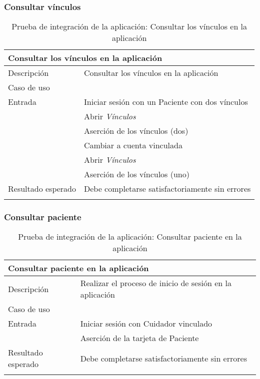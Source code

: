 \vspace{-15pt}
\subsubsection{Consultar vínculos}

\begin{longtable}{|p{} p{}|}
    \hline
    \multicolumn{2}{|l|}{\textbf{Consultar los vínculos en la aplicación}} \\ \hline 
    Descripción                 & Consultar los vínculos en la aplicación \\ \hline
    Caso de uso                 & \nameref{cu:consultar_cuidador} \\ \hline
    Entrada                     & Iniciar sesión con un Paciente con dos vínculos \\
                                & Abrir \emph{Vínculos} \\ 
                                & Aserción de los vínculos (dos) \\
                                & Cambiar a cuenta vinculada \\
                                & Abrir \emph{Vínculos} \\ 
                                & Aserción de los vínculos (uno) \\
                                \hline
    Resultado esperado          & Debe completarse satisfactoriamente sin errores \\ \hline
    \caption{Prueba de integración de la aplicación: Consultar los vínculos en la aplicación}
    \label{cp:i:app:consultar_vinculos}
\end{longtable}

\subsubsection{Consultar paciente}

\begin{longtable}{|p{} p{}|}
    \hline
    \multicolumn{2}{|l|}{\textbf{Consultar paciente en la aplicación}} \\ \hline 
    Descripción                 & Realizar el proceso de inicio de sesión en la aplicación \\ \hline
    Caso de uso                 & \nameref{cu:consultar_paciente} \\ \hline
    Entrada                     & Iniciar sesión con Cuidador vinculado \\
                                & Aserción de la tarjeta de Paciente \\ 
    Resultado esperado          & Debe completarse satisfactoriamente sin errores \\ \hline
    \caption{Prueba de integración de la aplicación: Consultar paciente en la aplicación}
    \label{cp:i:app:consultar_paciente}
\end{longtable}